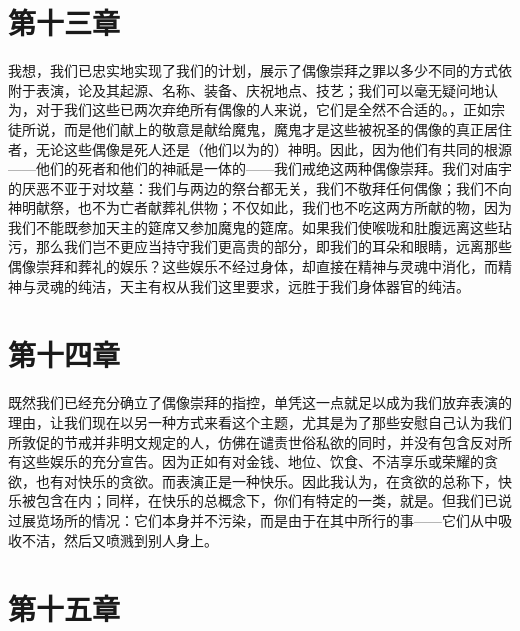 
\section{第十三章}

我想，我们已忠实地实现了我们的计划，展示了偶像崇拜之罪以多少不同的方式依附于表演，论及其起源、名称、装备、庆祝地点、技艺；我们可以毫无疑问地认为，对于我们这些已两次弃绝所有偶像的人来说，它们是全然不合适的。，正如宗徒所说，而是他们献上的敬意是献给魔鬼，魔鬼才是这些被祝圣的偶像的真正居住者，无论这些偶像是死人还是（他们以为的）神明。因此，因为他们有共同的根源——他们的死者和他们的神祇是一体的——我们戒绝这两种偶像崇拜。我们对庙宇的厌恶不亚于对坟墓：我们与两边的祭台都无关，我们不敬拜任何偶像；我们不向神明献祭，也不为亡者献葬礼供物；不仅如此，我们也不吃这两方所献的物，因为我们不能既参加天主的筵席又参加魔鬼的筵席。如果我们使喉咙和肚腹远离这些玷污，那么我们岂不更应当持守我们更高贵的部分，即我们的耳朵和眼睛，远离那些偶像崇拜和葬礼的娱乐？这些娱乐不经过身体，却直接在精神与灵魂中消化，而精神与灵魂的纯洁，天主有权从我们这里要求，远胜于我们身体器官的纯洁。\par


\section{第十四章}

既然我们已经充分确立了偶像崇拜的指控，单凭这一点就足以成为我们放弃表演的理由，让我们现在以另一种方式来看这个主题，尤其是为了那些安慰自己认为我们所敦促的节戒并非明文规定的人，仿佛在谴责世俗私欲的同时，并没有包含反对所有这些娱乐的充分宣告。因为正如有对金钱、地位、饮食、不洁享乐或荣耀的贪欲，也有对快乐的贪欲。而表演正是一种快乐。因此我认为，在贪欲的总称下，快乐被包含在内；同样，在快乐的总概念下，你们有特定的一类，就是。但我们已说过展览场所的情况：它们本身并不污染，而是由于在其中所行的事——它们从中吸收不洁，然后又喷溅到别人身上。\par


\section{第十五章}

